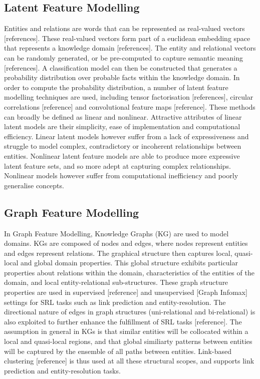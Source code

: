 \subsection{Latent Feature Modelling} %
Entities and relations are words that can be represented as real-valued vectors [references]. These real-valued vectors form part of a euclidean embedding space that represents a knowledge domain [references]. The entity and relational vectors can be randomly generated, or be pre-computed to capture semantic meaning [references]. A classification model can then be constructed that generates a probability distribution over probable facts within the knowledge domain. In order to compute the probability distribution, a number of latent feature modelling techniques are used, including tensor factorisation [references], circular correlations [reference] and convolutional feature maps [reference]. These methods can broadly be defined as linear and nonlinear. Attractive attributes of linear latent models are their simplicity, ease of implementation and computational efficiency. Linear latent models however suffer from a lack of expressiveness and struggle to model complex, contradictory or incoherent relationships between entities. Nonlinear latent feature models are able to produce more expressive latent feature sets, and so more adept at capturing complex relationships. Nonlinear models however suffer from computational inefficiency and poorly generalise concepts. \newline
\subsection{Graph Feature Modelling} %
In Graph Feature Modelling, Knowledge Graphs (KG) are used to model domains. KGs are composed of nodes and edges, where nodes represent entities and edges represent relations. The graphical structure then captures local, quasi-local and global domain properties. This global structure exhibits particular properties about relations within the domain, characteristics of the entities of the domain, and local entity-relational sub-structures. These graph structure properties are used in supervised [reference] and unsupervised [Graph Infomax] settings for SRL tasks such as link prediction and entity-resolution. The directional nature of edges in graph structures (uni-relational and bi-relational) is also exploited to further enhance the fulfillment of SRL tasks [reference]. The assumption in general in KGs is that similar entities will be collocated within a local and quasi-local regions, and that global similiarty patterns between entities will be captured by the ensemble of all paths between entities. Link-based clustering [reference] is thus used at all these structural scopes, and supports link prediction and entity-resolution tasks. 
